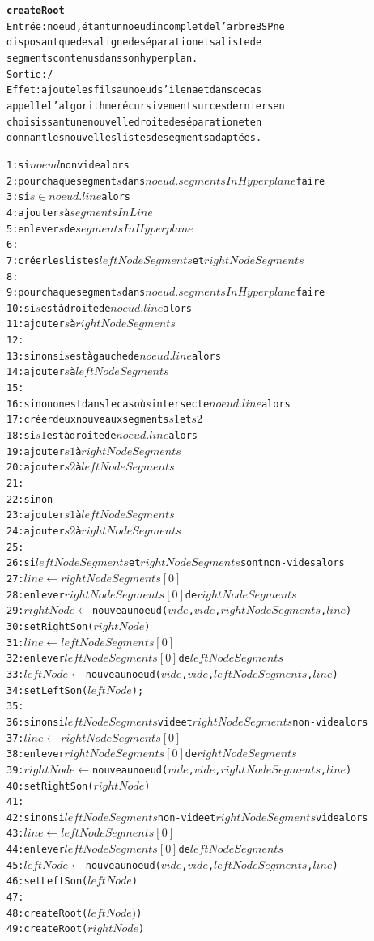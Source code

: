 \documentclass[11pt,a4paper]{article}
\begin{document}
\begin{alltt}
\textbf{createRoot}
Entrée : noeud, étant un noeud incomplet de l'arbre BSP ne
disposant que de sa ligne de séparation et sa liste de
segments contenus dans son hyperplan.
Sortie : /
Effet : ajoute les fils au noeud s'il en a et dans ce cas 
appelle l'algorithme récursivement sur ces derniers en 
choisissant une nouvelle droite de séparation et en 
donnant les nouvelles listes de segments adaptées.

 1: si \(noeud\) non vide alors
 2:   pour chaque segment \(s\) dans \(noeud.segmentsInHyperplane\) faire
 3:     si \(s \in noeud.line\) alors
 4:       ajouter \(s\) à \(segmentsInLine\)
 5:       enlever \(s\) de \(segmentsInHyperplane\)
 6:       
 7:   créer les listes \(leftNodeSegments\) et \(rightNodeSegments\)
 8:   
 9:   pour chaque segment \(s\) dans \(noeud.segmentsInHyperplane\) faire
10:     si \(s\) est à droite de \(noeud.line\) alors
11:       ajouter \(s\) à \(rightNodeSegments\)
12:
13:     sinon si \(s\) est à gauche de \(noeud.line\) alors
14:       ajouter \(s\) à \(leftNodeSegments\)
15:
16:     sinon on est dans le cas où \(s\) intersecte \(noeud.line\) alors
17:       créer deux nouveaux segments \(s1\) et \(s2\)
18:       si \(s1\) est à droite de \(noeud.line\) alors
19:         ajouter \(s1\) à \(rightNodeSegments\)
20:         ajouter \(s2\) à \(leftNodeSegments\)
21:
22:       sinon
23:         ajouter \(s1\) à \(leftNodeSegments\)
24:         ajouter \(s2\) à \(rightNodeSegments\)
25:         
26:   si \(leftNodeSegments\) et \(rightNodeSegments\) sont non-vides alors
27:     \(line \leftarrow rightNodeSegments[0]\)
28:     enlever \(rightNodeSegments[0]\) de \(rightNodeSegments\)
29:     \(rightNode \leftarrow\) nouveau noeud (\(vide\), \(vide\), \(rightNodeSegments\), \(line\))
30:     setRightSon(\(rightNode\))
31:     \(line \leftarrow leftNodeSegments[0]\)
32:     enlever \(leftNodeSegments[0]\) de \(leftNodeSegments\)
33:     \(leftNode \leftarrow\) nouveau noeud (\(vide\), \(vide\), \(leftNodeSegments\), \(line\))
34:     setLeftSon(\(leftNode\));
35:     
36:   sinon si \(leftNodeSegments\) vide et \(rightNodeSegments\) non-vide alors
37:     \(line \leftarrow rightNodeSegments[0]\)
38:     enlever \(rightNodeSegments[0]\) de \(rightNodeSegments\)
39:     \(rightNode \leftarrow \) nouveau noeud (\(vide\), \(vide\), \(rightNodeSegments\), \(line\))
40:     setRightSon(\(rightNode\))
41:    
42:   sinon si \(leftNodeSegments\) non-vide et \(rightNodeSegments\) vide alors
43:     \(line \leftarrow leftNodeSegments[0]\)
44:     enlever \(leftNodeSegments[0]\) de \(leftNodeSegments\)
45:     \(leftNode \leftarrow \) nouveau noeud (\(vide\), \(vide\), \(leftNodeSegments\), \(line\))
46:     setLeftSon(\(leftNode\))
47:     
48:   createRoot(\(leftNode)\))
49:   createRoot(\(rightNode\))
\end{alltt}
\end{document}
